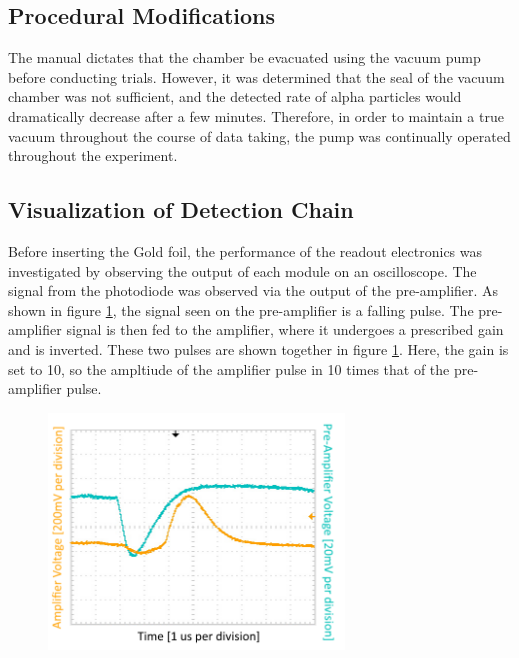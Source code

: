\documentclass[a4paper]{article}
\begin{document}
\subsection{Procedural Modifications}
\qq The manual dictates that the chamber be evacuated using the vacuum pump
before conducting trials. However, it was determined that the seal of the vacuum
chamber was not sufficient, and the detected rate of alpha particles would
dramatically decrease after a few minutes. Therefore, in order to maintain a
true vacuum throughout the course of data taking, the pump was continually
operated throughout the experiment.  \qq

\subsection{Visualization of Detection Chain}
Before inserting the Gold foil, the performance of the readout electronics was investigated by observing the output of each module on an oscilloscope. The signal from the photodiode was observed via the output of the pre-amplifier. As shown in figure \ref{preamp_amp}, the signal seen on the pre-amplifier is a falling pulse. The pre-amplifier signal is then fed to the amplifier, where it undergoes a prescribed gain and is inverted. These two pulses are shown together in figure \ref{preamp_amp}. Here, the gain is set to 10, so the ampltiude of the amplifier pulse in 10 times that of the pre-amplifier pulse.

\begin{figure}[H]
\centering
\includegraphics[width=0.7\textwidth]{gain20_th400mV_ch1amp_ch2preamp/preamp_amp.png}
\label{preamp_amp}
\end{figure}
\end{document}
